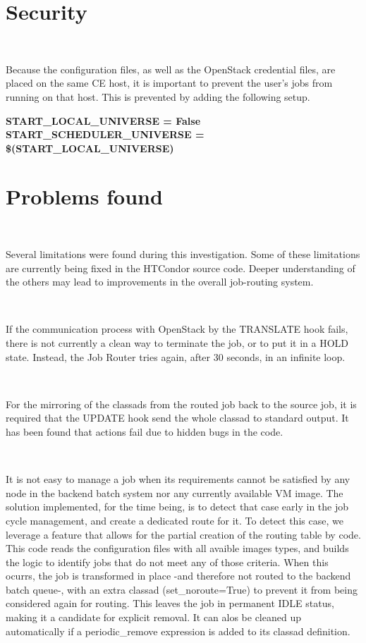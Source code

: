\documentclass[a4paper]{jpconf}
\begin{document}
\section{Security}

~

Because the configuration files, as well as the OpenStack credential files, 
are placed on the same CE host, it is important to prevent the user's jobs from running on that host.
This is prevented by adding the following setup.

\begin{center}
    \colorbox{htcondorbox}{
        \begin{minipage}{\textwidth}
        \small
            \bf{START\_LOCAL\_UNIVERSE = False \newline
                START\_SCHEDULER\_UNIVERSE = \$(START\_LOCAL\_UNIVERSE)
            }
        \end{minipage}
    }
\end{center}


\section{Problems found}

~

Several limitations were found during this investigation.
Some of these limitations are currently being fixed in the HTCondor source code.
Deeper understanding of the others may lead to improvements in the overall
job-routing system.

~

If the communication process with OpenStack by the TRANSLATE hook fails, 
there is not currently a clean way to terminate the job, or to put it in a HOLD
state. Instead, the Job Router tries again, after 30 seconds, in an infinite loop.

~

For the mirroring of the classads from the routed job back to the source job, 
it is required that the UPDATE hook send the whole classad to standard output. 
It has been found that actions fail due to hidden bugs in the code. 

~

It is not easy to manage a job when its requirements cannot be satisfied by any
node in the backend batch system nor any currently available VM image. 
The solution implemented, for the time being, is to detect that case early in
the job cycle management, and create a dedicated route for it. 
To detect this case, we leverage a feature that allows for the partial creation of the routing table by code.
This code reads the configuration files with all avaible images types, and builds the logic to identify jobs that do not meet any of those criteria. 
When this ocurrs, the job is transformed in place -and therefore not routed to
the backend batch queue-, with an extra classad (set\_noroute=True) to prevent it from being considered again for routing.
This leaves the job in permanent IDLE status, making it a candidate for
explicit removal. It can alos be cleaned up automatically if a
periodic\_remove expression is added to its classad definition.
\end{document}
